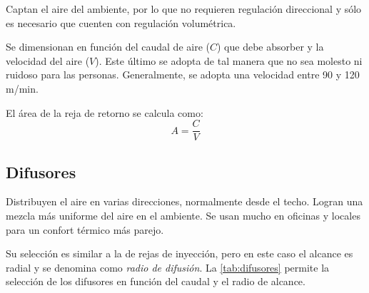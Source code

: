 Captan el aire del ambiente, por lo que no requieren regulación direccional y sólo es necesario que cuenten con regulación volumétrica.

Se dimensionan en función del caudal de aire ($C$) que debe absorber y la velocidad del aire ($V$). Este último se adopta de tal manera que no sea molesto ni ruidoso para las personas. Generalmente, se adopta una velocidad entre 90 y 120 m/min. 

El área de la reja de retorno se calcula como:
\begin{equation}
	A = \dfrac{C}{V}
\end{equation}


\subsection{Difusores}

Distribuyen el aire en varias direcciones, normalmente desde el techo. Logran una mezcla más uniforme del aire en el ambiente. Se usan mucho en oficinas y locales para un confort térmico más parejo.

Su selección es similar a la de rejas de inyección, pero en este caso el alcance es radial y se denomina como \emph{radio de difusión}. La \autoref{tab:difusores} permite la selección de los difusores en función del caudal y el radio de alcance.

